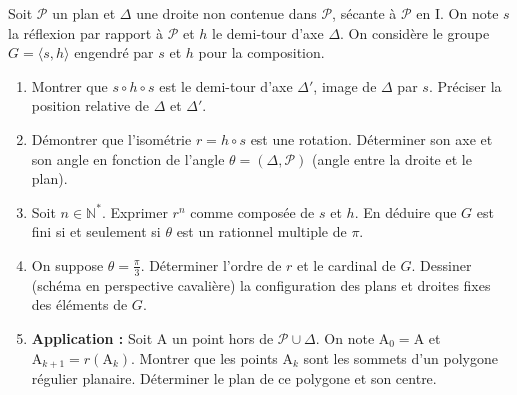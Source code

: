 \documentclass[11pt]{article}
\begin{document}
\begin{exercice}
Soit $\mathscr{P}$ un plan et $\Delta$ une droite non contenue dans $\mathscr{P}$, sécante à $\mathscr{P}$ en $\mathrm{I}$. On note $s$ la réflexion par rapport à $\mathscr{P}$ et $h$ le demi-tour d'axe $\Delta$. On considère le groupe $G = \langle s, h \rangle$ engendré par $s$ et $h$ pour la composition.

\begin{enumerate}
    \item Montrer que $s \circ h \circ s$ est le demi-tour d'axe $\Delta'$, image de $\Delta$ par $s$. Préciser la position relative de $\Delta$ et $\Delta'$.
    \item Démontrer que l'isométrie $r = h \circ s$ est une rotation. Déterminer son axe et son angle en fonction de l'angle $\theta = (\Delta, \mathscr{P})$ (angle entre la droite et le plan).
    \item Soit $n \in \mathbb{N}^*$. Exprimer $r^n$ comme composée de $s$ et $h$. En déduire que $G$ est fini si et seulement si $\theta$ est un rationnel multiple de $\pi$.
    \item On suppose $\theta = \frac{\pi}{3}$. Déterminer l'ordre de $r$ et le cardinal de $G$. Dessiner (schéma en perspective cavalière) la configuration des plans et droites fixes des éléments de $G$.
    \item \textbf{Application :} Soit $\mathrm{A}$ un point hors de $\mathscr{P} \cup \Delta$. On note $\mathrm{A}_0 = \mathrm{A}$ et $\mathrm{A}_{k+1} = r(\mathrm{A}_k)$. Montrer que les points $\mathrm{A}_k$ sont les sommets d'un polygone régulier planaire. Déterminer le plan de ce polygone et son centre.
\end{enumerate}
\end{exercice}
\end{document}
